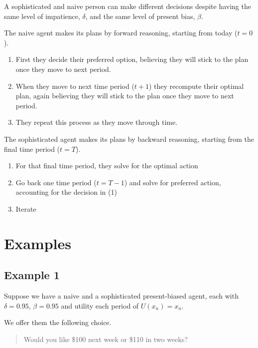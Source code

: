\documentclass[
  letterpaper,
  DIV=11,
  numbers=noendperiod]{scrreprt}
\begin{document}
A sophisticated and naive person can make different decisions despite
having the same level of impatience, \(\delta\), and the same level of
present bias, \(\beta\).

The naive agent makes its plans by forward reasoning, starting from
today (\(t=0\)).

\begin{enumerate}
\def\labelenumi{\arabic{enumi}.}
\item
  First they decide their preferred option, believing they will stick to
  the plan once they move to next period.
\item
  When they move to next time period (\(t+1\)) they recompute their
  optimal plan, again believing they will stick to the plan once they
  move to next period.
\item
  They repeat this process as they move through time.
\end{enumerate}

The sophisticated agent makes its plans by backward reasoning, starting
from the final time period (\(t=T\)).

\begin{enumerate}
\def\labelenumi{\arabic{enumi}.}
\item
  For that final time period, they solve for the optimal action
\item
  Go back one time period (\(t=T-1\)) and solve for preferred action,
  accounting for the decision in (1)
\item
  Iterate
\end{enumerate}

\hypertarget{examples}{%
\section{Examples}\label{examples}}

\hypertarget{example-1-4}{%
\subsection{Example 1}\label{example-1-4}}

Suppose we have a naive and a sophisticated present-biased agent, each
with \(\delta=0.95\), \(\beta=0.95\) and utility each period of
\(U(x_n)=x_n\).

We offer them the following choice.

\begin{quote}
Would you like \$100 next week or \$110 in two weeks?
\end{quote}
\end{document}
